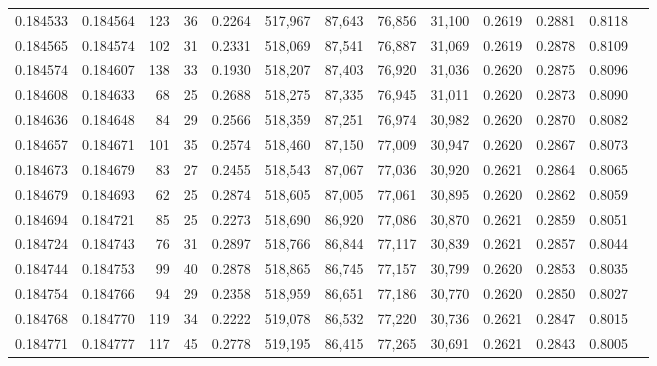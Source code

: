 \begin{tabular}{rrrrrrrrrrrrr}
0.184533 & 0.184564 &   123 &  36 &                                     0.2264 & 517,967 &  87,643 &  76,856 &  31,100 & 0.2619 & 0.2881 & 0.8118 \\
0.184565 & 0.184574 &   102 &  31 &                                     0.2331 & 518,069 &  87,541 &  76,887 &  31,069 & 0.2619 & 0.2878 & 0.8109 \\
0.184574 & 0.184607 &   138 &  33 &                                     0.1930 & 518,207 &  87,403 &  76,920 &  31,036 & 0.2620 & 0.2875 & 0.8096 \\
0.184608 & 0.184633 &    68 &  25 &                                     0.2688 & 518,275 &  87,335 &  76,945 &  31,011 & 0.2620 & 0.2873 & 0.8090 \\
0.184636 & 0.184648 &    84 &  29 &                                     0.2566 & 518,359 &  87,251 &  76,974 &  30,982 & 0.2620 & 0.2870 & 0.8082 \\
0.184657 & 0.184671 &   101 &  35 &                                     0.2574 & 518,460 &  87,150 &  77,009 &  30,947 & 0.2620 & 0.2867 & 0.8073 \\
0.184673 & 0.184679 &    83 &  27 &                                     0.2455 & 518,543 &  87,067 &  77,036 &  30,920 & 0.2621 & 0.2864 & 0.8065 \\
0.184679 & 0.184693 &    62 &  25 &                                     0.2874 & 518,605 &  87,005 &  77,061 &  30,895 & 0.2620 & 0.2862 & 0.8059 \\
0.184694 & 0.184721 &    85 &  25 &                                     0.2273 & 518,690 &  86,920 &  77,086 &  30,870 & 0.2621 & 0.2859 & 0.8051 \\
0.184724 & 0.184743 &    76 &  31 &                                     0.2897 & 518,766 &  86,844 &  77,117 &  30,839 & 0.2621 & 0.2857 & 0.8044 \\
0.184744 & 0.184753 &    99 &  40 &                                     0.2878 & 518,865 &  86,745 &  77,157 &  30,799 & 0.2620 & 0.2853 & 0.8035 \\
0.184754 & 0.184766 &    94 &  29 &                                     0.2358 & 518,959 &  86,651 &  77,186 &  30,770 & 0.2620 & 0.2850 & 0.8027 \\
0.184768 & 0.184770 &   119 &  34 &                                     0.2222 & 519,078 &  86,532 &  77,220 &  30,736 & 0.2621 & 0.2847 & 0.8015 \\
0.184771 & 0.184777 &   117 &  45 &                                     0.2778 & 519,195 &  86,415 &  77,265 &  30,691 & 0.2621 & 0.2843 & 0.8005 \\

\end{tabular}
